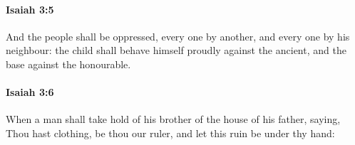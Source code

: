 		\paragraph{Isaiah 3:5} %
			\label{ISAIAH-3-5}

			And the people shall be oppressed, every one by another, and every one by his neighbour: the child shall behave himself proudly against the ancient, and the base against the honourable.


		\paragraph{Isaiah 3:6} %
			\label{ISAIAH-3-6}

			When a man shall take hold of his brother of the house of his father, saying, Thou hast clothing, be thou our ruler, and let this ruin be under thy hand:


